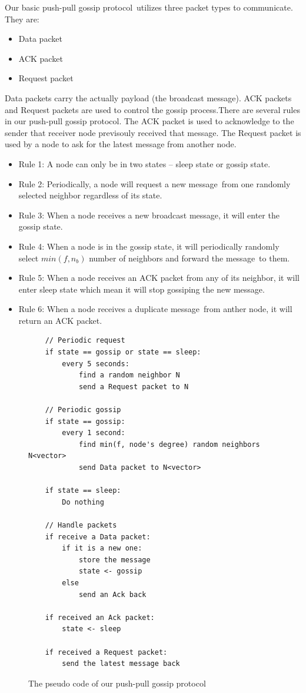 \documentclass[onehalf,11pt]{beavtex}
\newcommand{\gp}{gossip protocol}
\newcommand{\msg}{message}
\begin{document}
Our basic push-pull \gp ~utilizes three packet types to communicate. They are:
\begin{itemize}
	\item Data packet
	\item ACK packet 
	\item Request packet
\end{itemize}

Data packets carry the actually payload (the broadcast \msg). ACK packets and Request packets are used to control the gossip process.There are several rules in our push-pull \gp. The ACK packet is used to acknowledge to the sender that receiver node previsouly received that \msg. The Request packet is used by a node to ask for the latest message from another node.

\begin{itemize}
	\item Rule 1: A node can only be in two states -- sleep state or gossip state.
	\item Rule 2: Periodically, a node will request a new \msg ~from one randomly selected neighbor regardless of its state.
	\item Rule 3: When a node receives a new broadcast \msg, it will enter the gossip state.
	\item Rule 4: When a node is in the gossip state, it will periodically randomly select $min(f, n_b)$ number of neighbors and forward the \msg ~to them.
	\item Rule 5: When a node receives an ACK packet from any of its neighbor, it will enter sleep state which mean it will stop gossiping the new \msg.
	\item Rule 6: When a node receives a duplicate \msg ~from anther node, it will return an ACK packet. 
\end{itemize}

\begin{figure}[!htbp]
	\centering
	\begin{Verbatim}
	// Periodic request 
	if state == gossip or state == sleep:
		every 5 seconds:
			find a random neighbor N
			send a Request packet to N
	
	// Periodic gossip	
	if state == gossip:
		every 1 second:
			find min(f, node's degree) random neighbors N<vector>
			send Data packet to N<vector>
	
	if state == sleep:
		Do nothing
	
	// Handle packets
	if receive a Data packet:
		if it is a new one:
			store the message
			state <- gossip
		else
			send an Ack back

	if received an Ack packet:
		state <- sleep

	if received a Request packet:
		send the latest message back	
	\end{Verbatim}
	\caption{The pseudo code of our push-pull \gp}
	\label{fig:pseudo}
\end{figure}
\end{document}
